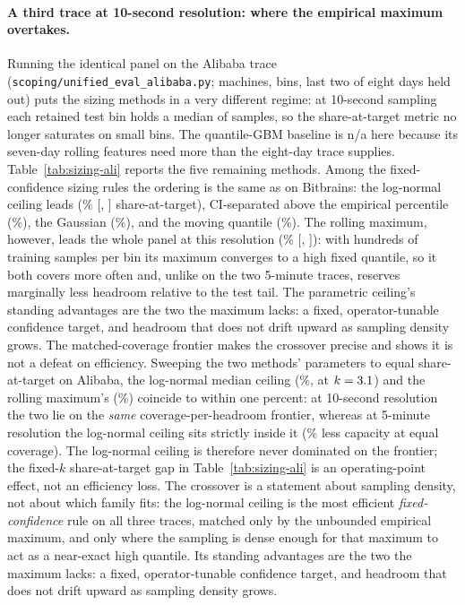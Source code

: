 \documentclass[11pt,a4paper]{article}
\begin{document}
\paragraph{A third trace at 10-second resolution: where the empirical
maximum overtakes.} Running the identical panel on the Alibaba trace
(\texttt{scoping/unified\_eval\_alibaba.py}; \AliPanelNVms{} machines,
\AliPanelNBins{} bins, last two of eight days held out) puts the sizing
methods in a very different regime: at 10-second sampling each retained
test bin holds a median of \AliMedNTest{} samples, so the share-at-target
metric no longer saturates on small bins. The quantile-GBM baseline is
n/a here because its seven-day rolling features need more than the
eight-day trace supplies. Table~\ref{tab:sizing-ali} reports the five
remaining methods. Among the fixed-confidence sizing rules the ordering
is the same as on Bitbrains: the log-normal ceiling leads
(\AliLNShare{}\% [\AliLNShareCiLo, \AliLNShareCiHi] share-at-target),
CI-separated above the empirical percentile (\AliEPShare{}\%), the
Gaussian (\AliGAShare{}\%), and the moving quantile (\AliEWMQShare{}\%).
The rolling maximum, however, leads the whole panel at this resolution
(\AliRMShare{}\% [\AliRMShareCiLo, \AliRMShareCiHi]): with hundreds of
training samples per bin its maximum converges to a high fixed quantile,
so it both covers more often and, unlike on the two 5-minute traces,
reserves marginally less headroom relative to the test tail. The
parametric ceiling's standing advantages are the two the maximum lacks:
a fixed, operator-tunable confidence target, and headroom that does not
drift upward as sampling density grows. The matched-coverage frontier makes the crossover precise and shows it is
not a defeat on efficiency. Sweeping the two methods' parameters to equal
share-at-target on Alibaba, the log-normal median ceiling
(\McAliLnCeil{}\%, at $k=3.1$) and the rolling maximum's
(\McAliRmCeil{}\%) coincide to within one percent: at 10-second
resolution the two lie on the \emph{same} coverage-per-headroom frontier,
whereas at 5-minute resolution the log-normal ceiling sits strictly
inside it (\McFsSavePct{}\% less capacity at equal coverage). The
log-normal ceiling is therefore never dominated on the frontier; the
fixed-$k$ share-at-target gap in Table~\ref{tab:sizing-ali} is an
operating-point effect, not an efficiency loss. The crossover is a
statement about sampling density, not about which family fits: the
log-normal ceiling is the most efficient \emph{fixed-confidence} rule on
all three traces, matched only by the unbounded empirical maximum, and
only where the sampling is dense enough for that maximum to act as a
near-exact high quantile. Its standing advantages are the two the maximum
lacks: a fixed, operator-tunable confidence target, and headroom that
does not drift upward as sampling density grows.
\end{document}
